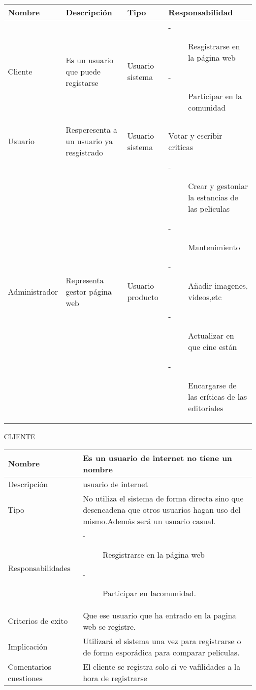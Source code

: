 \documentclass{article}
\begin{document}
\begin{table}[H]
    \begin{tabular}{||p{3cm} | p{3cm} | p{3cm} | p{3cm} ||}
    \hline
    \hline
    Nombre & Descripción & Tipo & Responsabilidad\\
    \hline
        Cliente & Es un usuario que puede registarse & Usuario sistema &                 \begin{description}
        \item[-] Resgistrarse en la página web 
        \item[-] Participar en la comunidad
        \end{description}\\
    \hline
    Usuario & Resperesenta a un usuario ya resgistrado & Usuario sistema & Votar y escribir criticas\\
    \hline
    Administrador & Representa gestor página web & Usuario producto & 
        \begin{description}
        \item[-] Crear y gestoniar la estancias de las películas
        \item[-] Mantenimiento 
        \item[-] Añadir imagenes, videos,etc 
        \item[-] Actualizar en que cine están 
        \item[-] Encargarse de las críticas de las editoriales  
        \end{description}\\
    \hline
    \hline
    \end{tabular}
\end{table}
\vspace{6cm}
CLIENTE
\begin{table}[H]
    \begin{tabular}{||p{4cm} | p{7cm} ||}
    \hline
    \hline
    Nombre & Es un usuario de internet no tiene un nombre \\
    \hline
    Descripción & usuario de internet\\
    \hline
    Tipo & No utiliza el sistema de forma directa sino que desencadena que otros usuarios hagan uso del mismo.Además será un usuario casual. \\
    \hline
    Responsabilidades & 
        \begin{description}
        \item[-]Resgistrarse en la página web 
        \item[-]Participar en lacomunidad. 
        \end{description}\\
    \hline
    Criterios de exito & Que ese usuario que ha entrado en la pagina web se registre. \\
    \hline
    Implicación & Utilizará el sistema una vez para registrarse o de forma esporádica para comparar películas. \\
    \hline
    Comentarios cuestiones & El cliente se registra solo si ve vafilidades a la hora de registrarse \\
    \hline
    \hline
    \end{tabular}
\end{table}
\end{document}
